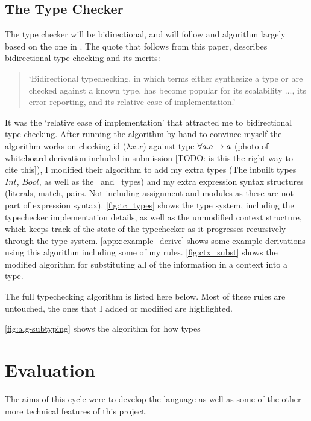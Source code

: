 \subsection{The Type Checker}
The type checker will be bidirectional, and will follow and algorithm largely based on the one in \cite{completebidir}. The quote that follows from this paper, describes bidirectional type checking and its merits:
\begin{quote}
`Bidirectional typechecking, in which terms either synthesize a type or are checked against a known type, has become popular for its scalability ..., its error reporting, and its relative ease of implementation.'\cite{completebidir}
\end{quote}
\noindent It was the `relative ease of implementation' that attracted me to bidirectional type checking. After running the algorithm by hand to convince myself the algorithm works on checking id ($\lambda x. x$) against type $\forall a.a\rightarrow a$ (photo of whiteboard derivation included in submission [TODO: is this the right way to cite this]), I modified their algorithm to add my extra types (The inbuilt types $Int$, $Bool$, as well as the \Uniontype\ and \Producttype\ types) and my extra expression syntax structures (literals, match, pairs. Not including assignment and modules as these are not part of expression syntax). \ref{fig:tc_types} shows the type system, including the typechecker implementation details, as well as the unmodified context structure, which keeps track of the state of the typechecker as it progresses recursively through the type system. \ref{appx:example_derive} shows some example derivations using this algorithm including some of my rules. \ref{fig:ctx_subst} shows the modified algorithm for substituting all of the information in a context into a type. 



The full typechecking algorithm is listed here below. Most of these rules are untouched, the ones that I added or modified are \colorbox{myTcRuleColour}{highlighted}.

\ref{fig:alg-subtyping} shows the algorithm for how types 





\section{Evaluation}
\label{ref:afg_figma}
The aims of this cycle were to develop the language as well as some of the other more technical features of this project. 

